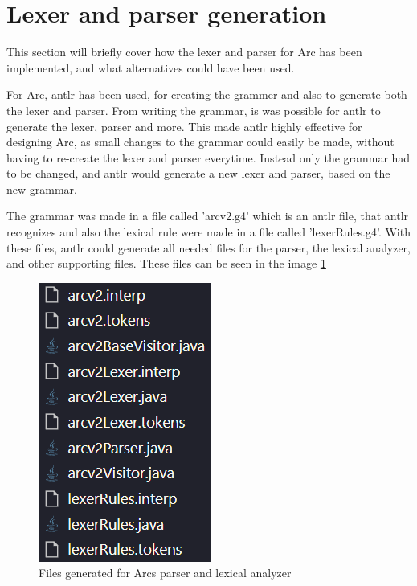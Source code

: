 \section{Lexer and parser generation}

This section will briefly cover how the lexer and parser for Arc has been implemented, and what alternatives could have been used.

For Arc, \gls{antlr} has been used, for creating the grammer and also to generate both the lexer and parser. From writing the grammar, is was possible for \gls{antlr} to generate the lexer, parser and more.\cite{Parr2014} This made \gls{antlr} highly effective for designing Arc, as small changes to the grammar could easily be made, without having to re-create the lexer and parser everytime. Instead only the grammar had to be changed, and \gls{antlr} would generate a new lexer and parser, based on the new grammar.

The grammar was made in a file called 'arcv2.g4' which is an \gls{antlr} file, that \gls{antlr} recognizes and also the lexical rule were made in a file called 'lexerRules.g4'. With these files, \gls{antlr} could generate all needed files for the parser, the lexical analyzer, and other supporting files. These files can be seen in the image \ref{fig:lexerandparserfiles}

\begin{figure}[htb!]
    \begin{center}
        \includegraphics{figures/lexerAndParserFiles.png}
        \caption{Files generated for Arcs parser and lexical analyzer}
        \label{fig:lexerandparserfiles}
    \end{center}
\end{figure}

